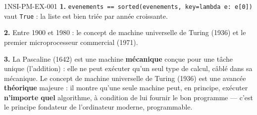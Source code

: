 \begin{corrige}{1NSI-PM-EX-001}
\textbf{1.} \lstinline{evenements == sorted(evenements, key=lambda e: e[0])} vaut
\lstinline{True} : la liste est bien triée par année croissante.

\textbf{2.} Entre 1900 et 1980 : le concept de machine universelle de Turing (1936) et le
premier microprocesseur commercial (1971).

\textbf{3.} La Pascaline (1642) est une machine \textbf{mécanique} conçue pour une tâche
unique (l'addition) : elle ne peut exécuter qu'un seul type de calcul, câblé dans sa
mécanique. Le concept de machine universelle de Turing (1936) est une avancée
\textbf{théorique} majeure : il montre qu'une seule machine peut, en principe, exécuter
\textbf{n'importe quel} algorithme, à condition de lui fournir le bon programme — c'est le
principe fondateur de l'ordinateur moderne, programmable.
\end{corrige}
